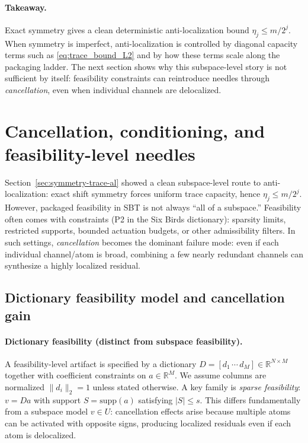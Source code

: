 \documentclass[11pt]{article}
\theoremstyle{plain}
\theoremstyle{definition}
\theoremstyle{remark}
\begin{document}
\paragraph{Takeaway.}
Exact symmetry gives a clean deterministic anti-localization bound \(\eta_j \le m/2^j\).
When symmetry is imperfect, anti-localization is controlled by diagonal capacity terms such as \eqref{eq:trace_bound_L2} and by how these terms scale along the packaging ladder.
The next section shows why this subspace-level story is not sufficient by itself: feasibility constraints can reintroduce needles through \emph{cancellation}, even when individual channels are delocalized.
 \section{Cancellation, conditioning, and feasibility-level needles}\label{sec:cancellation-conditioning}

Section~\ref{sec:symmetry-trace-al} showed a clean subspace-level route to anti-localization: exact shift symmetry forces uniform trace capacity, hence \(\eta_j \le m/2^j\).
However, packaged feasibility in SBT is not always ``all of a subspace.''
Feasibility often comes with constraints (P2 in the Six Birds dictionary): sparsity limits, restricted supports, bounded actuation budgets, or other admissibility filters.
In such settings, \emph{cancellation} becomes the dominant failure mode: even if each individual channel/atom is broad, combining a few nearly redundant channels can synthesize a highly localized residual.

\subsection{Dictionary feasibility model and cancellation gain}\label{subsec:dictionary_feasibility_model}

\paragraph{Dictionary feasibility (distinct from subspace feasibility).}
A feasibility-level artifact is specified by a dictionary \(D=[d_1\,\cdots\,d_M]\in\mathbb{R}^{N\times M}\) together with coefficient constraints on \(a\in\mathbb{R}^M\).
We assume columns are normalized \(\|d_i\|_2=1\) unless stated otherwise.
A key family is \emph{sparse feasibility}: \(v=Da\) with support \(S=\mathrm{supp}(a)\) satisfying \(|S|\le s\).
This differs fundamentally from a subspace model \(v\in U\): cancellation effects arise because multiple atoms can be activated with opposite signs, producing localized residuals even if each atom is delocalized.
\end{document}

